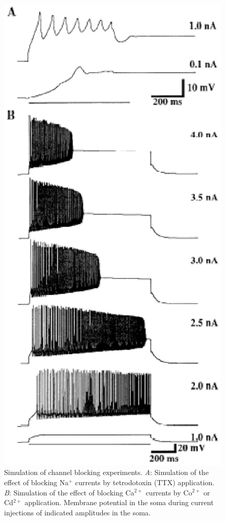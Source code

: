 \documentclass[12pt]{article}
\begin{document}
\begin{figure}[h]
\centering
   \includegraphics[scale=1]{figures/Fig.1.9.eps}
   \caption{Simulation of channel blocking experiments. {\it A}: Simulation of the effect of blocking Na$^+$ currents by tetrodotoxin (TTX) application. {\it B}: Simulation of the effect of blocking Ca$^{2+}$ currents by Co$^{2+}$ or Cd$^{2+}$ application. Membrane potential in the soma during current injections of indicated amplitudes in the soma.}
   \label{fig:DS1.9}
\end{figure}
\end{document}
